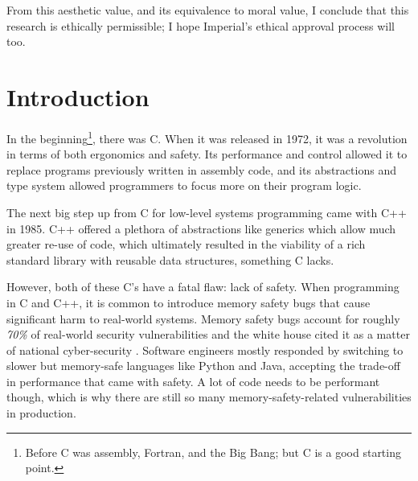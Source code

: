 \documentclass[12pt,twoside]{report}
\begin{document}
From this aesthetic value, and its equivalence to moral value, I conclude that this research is ethically permissible; I hope Imperial's ethical approval process will too.

\clearpage{\pagestyle{empty}\cleardoublepage}

{\small
\begingroup
\setlength{\parskip}{0pt} %
\setlength{\parindent}{0pt} %
\renewcommand{\baselinestretch}{0.9} %
\tableofcontents
\endgroup
}


\setcounter{page}{1}
\fancyhead[LE,RO]{\slshape \rightmark}
\fancyhead[LO,RE]{\slshape \leftmark}

\chapter{Introduction}
In the beginning\footnote{Before C was assembly, Fortran, and the Big Bang; but C is a good starting point.}, there was C. When it was released in 1972, it was a revolution in terms of both ergonomics and safety. Its performance and control allowed it to replace programs previously written in assembly code, and its abstractions and type system allowed programmers to focus more on their program logic.

The next big step up from C for low-level systems programming came with C++ in 1985. C++ offered a plethora of abstractions like generics which allow much greater re-use of code, which ultimately resulted in the viability of a rich standard library with reusable data structures, something C lacks.

However, both of these C's have a fatal flaw: lack of safety. When programming in C and C++, it is common to introduce memory safety bugs that cause significant harm to real-world systems. Memory safety bugs account for roughly \textit{70\%} of real-world security vulnerabilities \citep{ProactiveApproachMore, MemorySafety} and the white house cited it as a matter of national cyber-security \citep[p. 8]{officeofthenationalcyberdirectorBackBuildingBlocks2024}. Software engineers mostly responded by switching to slower but memory-safe languages like Python and Java, accepting the trade-off in performance that came with safety. A lot of code needs to be performant though, which is why there are still so many memory-safety-related vulnerabilities in production.
\end{document}
